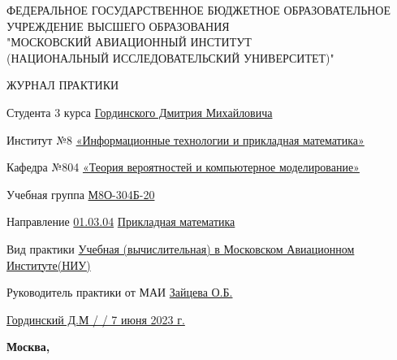 \begin{titlepage}
\begin{center}
\bfseries

{\Large ФЕДЕРАЛЬНОЕ ГОСУДАРСТВЕННОЕ БЮДЖЕТНОЕ ОБРАЗОВАТЕЛЬНОЕ\\ УЧРЕЖДЕНИЕ ВЫСШЕГО ОБРАЗОВАНИЯ\\ "МОСКОВСКИЙ АВИАЦИОННЫЙ ИНСТИТУТ\\ (НАЦИОНАЛЬНЫЙ ИССЛЕДОВАТЕЛЬСКИЙ УНИВЕРСИТЕТ)"

}

\vspace{56pt}

{\large ЖУРНАЛ ПРАКТИКИ 

}

\end{center}

\vspace{36pt}

Студента 3 курса \hspace{3cm}        \underline{Гординского Дмитрия Михайловича}

\vspace{26pt}

Институт №8 \underline{«Информационные технологии и прикладная математика»}

\vspace{26pt}

Кафедра №804 \underline{«Теория вероятностей и компьютерное моделирование»}

\vspace{26pt}

Учебная группа \underline{М8О-304Б-20}

\vspace{26pt}

Направление \underline{01.03.04} \hspace{3cm} \underline{Прикладная математика}

\vspace{26pt}

Вид практики \underline{Учебная (вычислительная) в Московском Авиационном Институте(НИУ)}

\vspace{26pt}

Руководитель практики от МАИ \underline{Зайцева О.Б.} \hspace{3cm} \underline{ \hspace{3cm}}

\vspace{46pt}

\underline{Гординский Д.М / \hspace{3cm} / 7 июня 2023 г.}

\vfill

\begin{center}
\bfseries
Москва, \the\year
\end{center}
\end{titlepage}

\pagebreak
